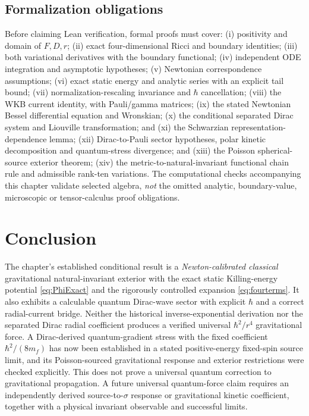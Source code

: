 \documentclass[11pt,a4paper,oneside]{report}
\numberwithin{equation}{chapter}
\theoremstyle{definition}\newtheorem{definition}[theorem]{Definition}
\theoremstyle{remark}\newtheorem{remark}[theorem]{Remark}
\begin{document}
\subsection*{Formalization obligations}
Before claiming Lean verification, formal proofs must cover: (i) positivity and domain of $F,D,r$; (ii) exact four-dimensional Ricci and boundary identities; (iii) both variational derivatives with the boundary functional; (iv) independent ODE integration and asymptotic hypotheses; (v) Newtonian correspondence assumptions; (vi) exact static energy and analytic series with an explicit tail bound; (vii) normalization-rescaling invariance and $\hbar$ cancellation; (viii) the WKB current identity, with Pauli/gamma matrices; (ix) the stated Newtonian Bessel differential equation and Wronskian; (x) the conditional separated Dirac system and Liouville transformation; and (xi) the Schwarzian representation-dependence lemma; (xii) Dirac-to-Pauli sector hypotheses, polar kinetic decomposition and quantum-stress divergence; and (xiii) the Poisson spherical-source exterior theorem; (xiv) the metric-to-natural-invariant functional chain rule and admissible rank-ten variations. The computational checks accompanying this chapter validate selected algebra, \emph{not} the omitted analytic, boundary-value, microscopic or tensor-calculus proof obligations.

\section{Conclusion}
The chapter's established conditional result is a \emph{Newton-calibrated classical} gravitational natural-invariant exterior with the exact static Killing-energy potential \eqref{eq:PhiExact} and the rigorously controlled expansion \eqref{eq:fourterms}. It also exhibits a calculable quantum Dirac-wave sector with explicit $\hbar$ and a correct radial-current bridge. Neither the historical inverse-exponential derivation nor the separated Dirac radial coefficient produces a verified universal $\hbar^2/r^4$ gravitational force. A Dirac-derived quantum-gradient stress with the fixed coefficient $\hbar^2/(8m_f)$ has now been established in a stated positive-energy fixed-spin source limit, and its Poisson-sourced gravitational response and exterior restrictions were checked explicitly. This does not prove a universal quantum correction to gravitational propagation. A future universal quantum-force claim requires an independently derived source-to-$\sigma$ response or gravitational kinetic coefficient, together with a physical invariant observable and successful limits.
\end{document}
